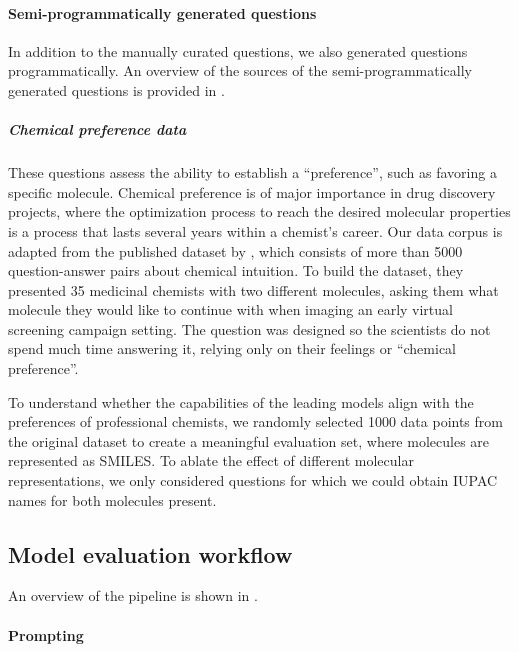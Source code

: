\documentclass[11pt, oneside]{article}
\begin{document}
\begin{refsection}
\paragraph{Semi-programmatically generated questions}
In addition to the manually curated questions, we also generated questions programmatically. An overview of the sources of the semi-programmatically generated questions is provided in .



\subparagraph{Chemical preference data}

These questions assess the ability to establish a \enquote{preference}, such as favoring a specific molecule. Chemical preference is of major importance in drug discovery projects, where the optimization process to reach the desired molecular properties is a process that lasts several years within a chemist's career.
Our data corpus is adapted from the published dataset by \textcite{Choung_2023}, which consists of more than 5000 question-answer pairs about chemical intuition. To build the dataset, they presented 35 medicinal chemists with two different molecules, asking them what molecule they would like to continue with when imaging an early virtual screening campaign setting. The question was designed so the scientists do not spend much time answering it, relying only on their feelings or \enquote{chemical preference}.

To understand whether the capabilities of the leading models align with the preferences of professional chemists, we randomly selected 1000 data points from the original dataset to create a meaningful evaluation set, where molecules are represented as SMILES.
To ablate the effect of different molecular representations, we only considered questions for which we could obtain IUPAC names for both molecules present.


\subsection{Model evaluation workflow}
An overview of the pipeline is shown in .

\paragraph{Prompting}


\end{refsection}
\end{document}
